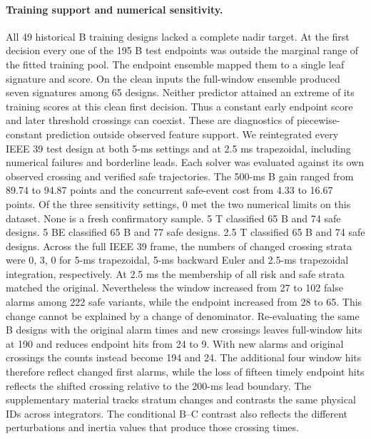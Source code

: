 \documentclass[10pt]{article}
\begin{document}
\paragraph{Training support and numerical sensitivity.} All 49 historical B training designs lacked a complete nadir target. At the first decision every one of the 195 B test endpoints was outside the marginal range of the fitted training pool. The endpoint ensemble mapped them to a single leaf signature and score. On the clean inputs the full-window ensemble produced seven signatures among 65 designs. Neither predictor attained an extreme of its training scores at this clean first decision. Thus a constant early endpoint score and later threshold crossings can coexist. These are diagnostics of piecewise-constant prediction outside observed feature support.
We reintegrated every IEEE 39 test design at both 5-ms settings and at 2.5 ms trapezoidal, including numerical failures and borderline leads. Each solver was evaluated against its own observed crossing and verified safe trajectories. The 500-ms B gain ranged from 89.74 to 94.87 points and the concurrent safe-event cost from 4.33 to 16.67 points. Of the three sensitivity settings, 0 met the two numerical limits on this dataset. None is a fresh confirmatory sample. 5 T classified 65 B and 74 safe designs. 5 BE classified 65 B and 77 safe designs. 2.5 T classified 65 B and 74 safe designs. Across the full IEEE 39 frame, the numbers of changed crossing strata were 0, 3, 0 for 5-ms trapezoidal, 5-ms backward Euler and 2.5-ms trapezoidal integration, respectively. At 2.5 ms the membership of all risk and safe strata matched the original. Nevertheless the window increased from 27 to 102 false alarms among 222 safe variants, while the endpoint increased from 28 to 65. This change cannot be explained by a change of denominator. Re-evaluating the same B designs with the original alarm times and new crossings leaves full-window hits at 190 and reduces endpoint hits from 24 to 9. With new alarms and original crossings the counts instead become 194 and 24. The additional four window hits therefore reflect changed first alarms, while the loss of fifteen timely endpoint hits reflects the shifted crossing relative to the 200-ms lead boundary. The supplementary material tracks stratum changes and contrasts the same physical IDs across integrators. The conditional B--C contrast also reflects the different perturbations and inertia values that produce those crossing times.
\end{document}
